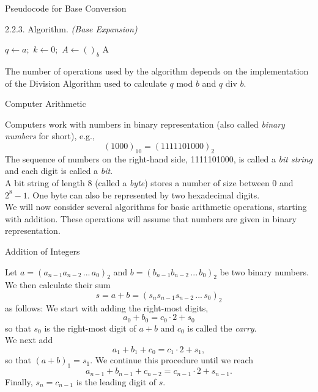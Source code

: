 \documentclass[smaller,hyperref={CJKbookmarks=true}]{beamer}
\newcounter{zhuo}[subsection]
\begin{document}
\begin{frame}[t]{Pseudocode for Base Conversion}
\begin{spacing}{1.05}
\alert{2.2.3. Algorithm.} \emph{(Base Expansion)}
\IncMargin{1em}
\begin{algorithm}[H]
$q\leftarrow a$;~$k\leftarrow0$;~$A\leftarrow()_b$\;
\Return A
\end{algorithm}\DecMargin{1em}
\vspace*{6pt}
The number of operations used by the algorithm depends on the
implementation of the Division Algorithm used to calculate $q$ mod $b$ and $q$ div $b$.
\end{spacing}
\end{frame}
\begin{frame}[c]{Computer Arithmetic}
\begin{spacing}{1.1}
Computers work with numbers in binary representation (also called \emph{binary
numbers} for short), e.g.,
\[(1000)_{10}=(1111101000)_2\]
The sequence of numbers on the right-hand side, 1111101000, is called a \emph{bit string} and each digit is called a \emph{bit}.\\[5pt]
A bit string of length 8 (called a \emph{byte}) stores a number of size between 0 and $2^8-1$. One byte can also be represented by two hexadecimal digits.\\[6pt]
We will now consider several algorithms for basic arithmetic operations,
starting with addition. These operations will assume that numbers are
given in binary representation.
\end{spacing}
\end{frame}
\begin{frame}[t]{Addition of Integers}
\begin{spacing}{1}
Let $a=(a_{n-1}a_{n-2}\,...\,a_0)_2$ and $b=(b_{n-1}b_{n-2}\,...\,b_0)_2$ be two binary numbers. We then calculate their sum
\[s=a+b=(s_ns_{n-1}s_{n-2}\,...\,s_0)_2\]
as follows: We start with adding the right-most digits,
\begin{equation}\label{2.2.2}
a_0+b_0=c_0\cdot2+s_0
\end{equation}
so that $s_0$ is the right-most digit of $a+b$ and $c_0$ is called the \emph{carry}.\\[6pt]
We next add
\[a_1+b_1+c_0=c_1\cdot2+s_1,\]
so that $(a+b)_1=s_1$. We continue this procedure until we reach
\[a_{n-1}+b_{n-1}+c_{n-2}=c_{n-1}\cdot2+s_{n-1}.\]
Finally, $s_n=c_{n-1}$ is the leading digit of $s$.
\end{spacing}
\end{frame}
\end{document}
